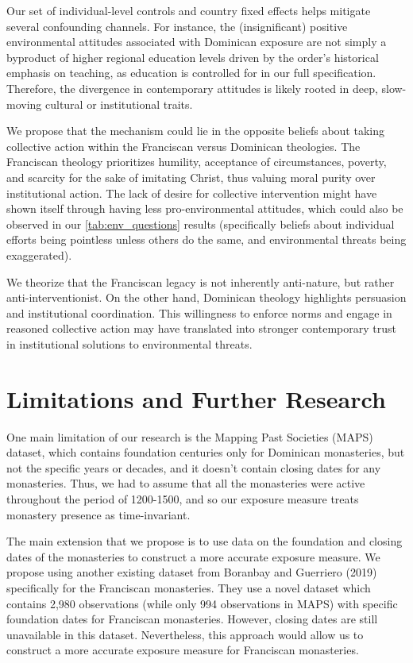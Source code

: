 \documentclass[12pt, a4paper]{article}
\begin{document}
Our set of individual-level controls and country fixed effects helps mitigate several confounding channels. 
For instance, the (insignificant) positive environmental attitudes associated with Dominican exposure are not simply a byproduct of 
higher regional education levels driven by the order's historical emphasis on teaching, as education is controlled for in our full specification. 
Therefore, the divergence in contemporary attitudes is likely rooted in deep, slow-moving cultural or institutional traits.

We propose that the mechanism could lie in the opposite beliefs about taking collective action within the Franciscan 
versus Dominican theologies. The Franciscan theology prioritizes humility, acceptance of circumstances, 
poverty, and scarcity for the sake of imitating Christ, thus valuing moral purity over institutional action. The lack 
of desire for collective intervention might have shown itself through having less pro-environmental attitudes, which 
could also be observed in our \autoref{tab:env_questions} results (specifically beliefs about individual efforts being pointless unless others do the same, 
and environmental threats being exaggerated).

We theorize that the Franciscan legacy is not inherently anti-nature, but rather anti-interventionist. 
On the other hand, Dominican theology highlights persuasion and institutional coordination. 
This willingness to enforce norms and engage in reasoned collective action may have translated into stronger contemporary trust in institutional solutions to environmental threats.

\FloatBarrier

\section{Limitations and Further Research}

One main limitation of our research is the Mapping Past Societies (MAPS) dataset, which contains foundation
centuries only for Dominican monasteries, but not the specific years or decades, and it doesn't contain closing dates for any 
monasteries. Thus, we had to assume that all the monasteries were active throughout the period of 1200-1500, and so 
our exposure measure treats monastery presence as time-invariant.

The main extension that we propose is to use data on the foundation and closing dates of the 
monasteries to construct a more accurate exposure measure. We propose using another existing 
dataset from Boranbay and Guerriero (2019) specifically for the Franciscan monasteries. They use a novel
dataset which contains 2,980 observations (while only 994 observations in MAPS) with specific foundation dates 
for Franciscan monasteries. However, closing dates are still unavailable in this dataset.
Nevertheless, this approach would allow us to construct a more accurate exposure measure for Franciscan monasteries.
\end{document}
